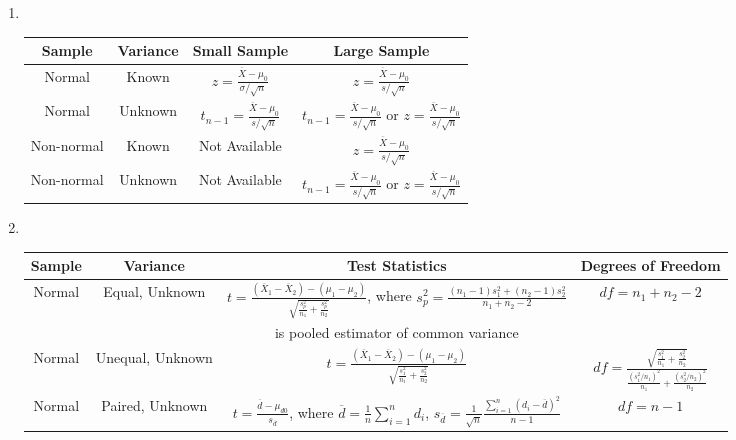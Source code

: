\begin{method}
\begin{enumerate}[label=\roman*.]
\setlength{\itemsep}{0pt}
\item {} \\
\begin{tabular}{|c|c|c|c|}
\hline
\rowcolor{gray!30}
Sample & Variance & Small Sample & Large Sample \\
\hline 
Normal & Known & $z = \frac{\overline{X} - \mu_0}{\sigma /\sqrt{n}}$ & $z = \frac{\overline{X} - \mu_0}{s /\sqrt{n}}$\\
\hline
Normal & Unknown & $t_{n-1} = \frac{\overline{X} - \mu_0}{s/\sqrt{n}}$ & $t_{n-1} = \frac{\overline{X} - \mu_0}{s/\sqrt{n}}$ or $z = \frac{\overline{X} - \mu_0}{s /\sqrt{n}}$ \\
\hline
Non-normal & Known & Not Available & $z = \frac{\overline{X} - \mu_0}{s /\sqrt{n}}$ \\
\hline
Non-normal & Unknown & Not Available & $t_{n-1} = \frac{\overline{X} - \mu_0}{s/\sqrt{n}}$ or $z = \frac{\overline{X} - \mu_0}{s /\sqrt{n}}$ \\
\hline
\end{tabular}
\item {} \\
\begin{tabular}{|c|c|c|c|}
\hline
\rowcolor{gray!30}
Sample & Variance & Test Statistics & Degrees of Freedom \\
\hline 
Normal & Equal, Unknown & $t = \frac{(\overline{X}_1 - \overline{X}_2) - (\mu_1 - \mu_2)}{\sqrt{\frac{s_p^2}{n_1} + \frac{s_p^2}{n_2}}}$, where $s_p^2 = \frac{(n_1 - 1)s_1^2 + (n_2 - 1)s_2^2}{n_1 + n_2 - 2}$ & $df = n_1 + n_2 -2$ \\
& &  is pooled estimator of common variance & \\
\hline
Normal & Unequal, Unknown & $t = \frac{(\overline{X}_1 - \overline{X}_2) - (\mu_1 - \mu_2)}{\sqrt{\frac{s_1^2}{n_1} + \frac{s_2^2}{n_2}}}$ & $df = \frac{\sqrt{\frac{s_1^2}{n_1} + \frac{s_2^2}{n_2}}}{\frac{(s_1^2 / n_1)^2}{n_1} + \frac{(s_2^2 / n_2)^2}{n_2}}$ \\
\hline
Normal & Paired, Unknown & $t = \frac{\overline{d} - \mu_{d0}}{s_{\overline{d}}}$, where $\overline{d} = \frac{1}{n} \sum\limits_{i=1}^n d_i$, $s_{\overline{d}} = \frac{1}{\sqrt{n}} \frac{\sum\limits_{i=1}^n (d_i - \overline{d})^2}{n-1}$ & $df = n-1$ \\
\hline
\end{tabular}

\end{enumerate}
\end{method}

